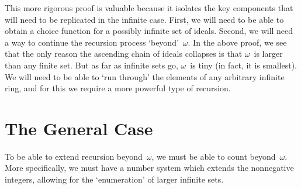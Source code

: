 \documentclass[letterpaper]{article}
\begin{document}
This more rigorous proof is valuable because it isolates the key components that will need to be replicated in the infinite case. First, we will need to be able to obtain a choice function for a possibly infinite set of ideals. Second, we will need a way to continue the recursion process `beyond'~$\omega$. In the above proof, we see that the only reason the ascending chain of ideals collapses is that $\omega$~is larger than any finite set. But as far as infinite sets go, $\omega$~is tiny (in fact, it is smallest). We will need to be able to `run through' the elements of any arbitrary infinite ring, and for this we require a more powerful type of recursion.

\section*{The General Case}
To be able to extend recursion beyond~$\omega$, we must be able to count beyond~$\omega$. More specifically, we must have a number system which extends the nonnegative integers, allowing for the `enumeration' of larger infinite sets.
\end{document}
